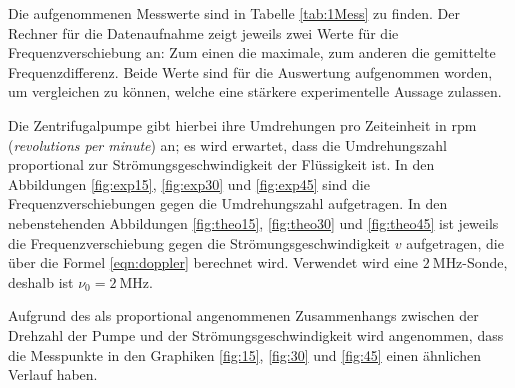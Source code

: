 Die aufgenommenen Messwerte sind in Tabelle \ref{tab:1Mess} zu finden. 
Der Rechner für die Datenaufnahme zeigt jeweils zwei Werte für die Frequenzverschiebung an: Zum einen die maximale, zum 
anderen die gemittelte Frequenzdifferenz. 
Beide Werte sind für die Auswertung aufgenommen worden, um vergleichen zu können, welche eine stärkere experimentelle Aussage zulassen. 

Die Zentrifugalpumpe gibt hierbei ihre Umdrehungen pro Zeiteinheit in $\mathrm{rpm}$ (\textit{revolutions per minute}) an; es wird erwartet, dass die Umdrehungszahl 
proportional zur Strömungsgeschwindigkeit der Flüssigkeit ist. 
In den Abbildungen \ref{fig:exp15}, \ref{fig:exp30} und \ref{fig:exp45} sind die Frequenzverschiebungen gegen die Umdrehungszahl aufgetragen. 
In den nebenstehenden Abbildungen \ref{fig:theo15}, \ref{fig:theo30} und \ref{fig:theo45} ist jeweils die Frequenzverschiebung 
gegen die Strömungsgeschwindigkeit $v$ aufgetragen, die über die Formel \eqref{eqn:doppler}
berechnet wird. Verwendet wird eine $\SI{2}{\mega\hertz}$-Sonde, deshalb ist $\nu_0=\SI{2}{\mega\hertz}$. 

Aufgrund des als proportional angenommenen Zusammenhangs zwischen der Drehzahl der Pumpe und der Strömungsgeschwindigkeit 
wird angenommen, dass die Messpunkte in den Graphiken \ref{fig:15}, \ref{fig:30} und \ref{fig:45} einen ähnlichen Verlauf haben. 

